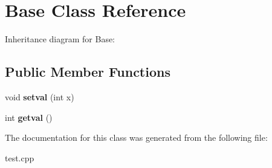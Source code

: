 \hypertarget{classBase}{}\section{Base Class Reference}
\label{classBase}


Inheritance diagram for Base\+:
\subsection*{Public Member Functions}
\begin{DoxyCompactItemize}
\item 
void {\bfseries setval} (int x)\hypertarget{classBase_ad93b3a60c3038a09cbee54442fa96b7e}{}\label{classBase_ad93b3a60c3038a09cbee54442fa96b7e}

\item 
int {\bfseries getval} ()\hypertarget{classBase_a837195199d88669767662b478a373142}{}\label{classBase_a837195199d88669767662b478a373142}

\end{DoxyCompactItemize}


The documentation for this class was generated from the following file\+:\begin{DoxyCompactItemize}
\item 
test.\+cpp\end{DoxyCompactItemize}
